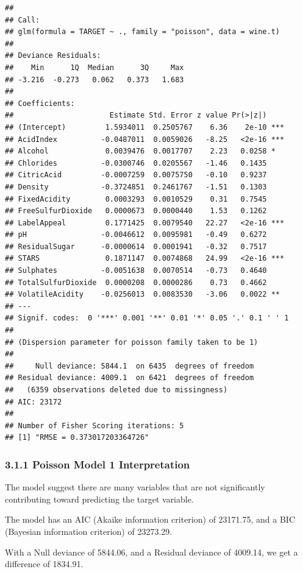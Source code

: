 \documentclass[]{article}
\begin{document}
\begin{verbatim}
## 
## Call:
## glm(formula = TARGET ~ ., family = "poisson", data = wine.t)
## 
## Deviance Residuals: 
##    Min      1Q  Median      3Q     Max  
## -3.216  -0.273   0.062   0.373   1.683  
## 
## Coefficients:
##                      Estimate Std. Error z value Pr(>|z|)    
## (Intercept)         1.5934011  0.2505767    6.36    2e-10 ***
## AcidIndex          -0.0487011  0.0059026   -8.25   <2e-16 ***
## Alcohol             0.0039476  0.0017707    2.23   0.0258 *  
## Chlorides          -0.0300746  0.0205567   -1.46   0.1435    
## CitricAcid         -0.0007259  0.0075750   -0.10   0.9237    
## Density            -0.3724851  0.2461767   -1.51   0.1303    
## FixedAcidity        0.0003293  0.0010529    0.31   0.7545    
## FreeSulfurDioxide   0.0000673  0.0000440    1.53   0.1262    
## LabelAppeal         0.1771425  0.0079540   22.27   <2e-16 ***
## pH                 -0.0046612  0.0095981   -0.49   0.6272    
## ResidualSugar      -0.0000614  0.0001941   -0.32   0.7517    
## STARS               0.1871147  0.0074868   24.99   <2e-16 ***
## Sulphates          -0.0051638  0.0070514   -0.73   0.4640    
## TotalSulfurDioxide  0.0000208  0.0000286    0.73   0.4662    
## VolatileAcidity    -0.0256013  0.0083530   -3.06   0.0022 ** 
## ---
## Signif. codes:  0 '***' 0.001 '**' 0.01 '*' 0.05 '.' 0.1 ' ' 1
## 
## (Dispersion parameter for poisson family taken to be 1)
## 
##     Null deviance: 5844.1  on 6435  degrees of freedom
## Residual deviance: 4009.1  on 6421  degrees of freedom
##   (6359 observations deleted due to missingness)
## AIC: 23172
## 
## Number of Fisher Scoring iterations: 5
## [1] "RMSE = 0.373017203364726"
\end{verbatim}

\hypertarget{poisson-model-1-interpretation}{%
\subsubsection{3.1.1 Poisson Model 1
Interpretation}\label{poisson-model-1-interpretation}}

The model suggest there are many variables that are not significantly
contributing toward predicting the target variable.

The model has an AIC (Akaike information criterion) of 23171.75, and a
BIC (Bayesian information criterion) of 23273.29.

With a Null deviance of 5844.06, and a Residual deviance of 4009.14, we
get a difference of 1834.91.
\end{document}
